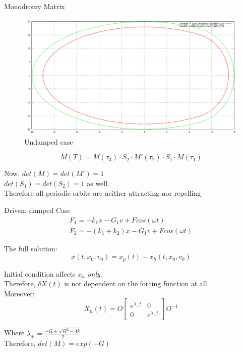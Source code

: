 \documentclass[xcolor=x11names,compress]{beamer}
\renewcommand{\(}{\begin{columns}}
\renewcommand{\)}{\end{columns}}
\newcommand{\<}[1]{\begin{column}{#1}}
\renewcommand{\>}{\end{column}}
\begin{document}
\begin{frame}{Monodromy Matrix}
\begin{figure}
\caption{Undamped case}
\begin{center}
\includegraphics[width=0.5\columnwidth]{nodamp}
\end{center}
\end{figure}

\[
M(T)= M(\tau_3)\cdot S_2\cdot M'(\tau_2)\cdot S_1\cdot M(\tau_1)
\]

Now, $det(M)=det(M')=1$\\
$det(S_1)=det(S_2)=1$ as well.  \\

Therefore all periodic orbits are neither attracting nor repelling
\end{frame}

\begin{frame}[label=BackFromSHMFormula]{Driven, damped Case}
\begin{eqnarray*}
F_1=-k_1x-G_1v+Fcos(\omega t)\\
F_2=-(k_1+k_2)x-G_1v+Fcos(\omega t)
\end{eqnarray*}


The full solution:\\
\[
x(t,x_0,v_0)=x_p(t)+x_h(t,x_0,v_0)
\]

\hyperlink{SHM-driven}{}

Initial condition affects $x_h$ \emph{only}.\\
Therefore, $\delta X(t)$ is not dependent on the forcing function at all.  \\

Moreover:\[
X_h(t)=O\begin{bmatrix}e^{\lambda_+t} & 0\\0 & e^{\lambda_-t}\end{bmatrix}O^{-1}
\]

Where $\lambda_\pm=\frac{-G\pm\sqrt{G^2-4k}}{2}$\\
Therefore, $det(M)=exp(-G)$
\end{frame}
\end{document}
